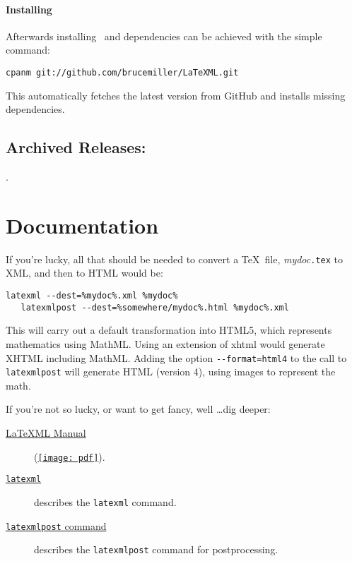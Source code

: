 \documentclass{article}
\newcommand{\PDFIcon}{\texttt{[image: pdf]}}
\begin{document}
\paragraph*{Installing} Afterwards installing \LaTeXML\ and dependencies can be achieved with the 
simple command:
\begin{lstlisting}[style=shell]
    cpanm git://github.com/brucemiller/LaTeXML.git
\end{lstlisting}
This automatically fetches the latest version from GitHub and installs 
missing dependencies. 

\subsection{Archived Releases:}\label{get.archive}
\AllReleases.

\section{Documentation}\label{docs}
If you're lucky, all that should be needed to convert
a \TeX\ file, \textit{mydoc}\texttt{.tex} to XML, and
then to HTML would be:
\begin{lstlisting}[style=shell]
   latexml --dest=%mydoc%.xml %mydoc%
   latexmlpost --dest=%somewhere/mydoc%.html %mydoc%.xml
\end{lstlisting}
This will carry out a default transformation into HTML5,
which represents mathematics using MathML.  Using an
extension of xhtml would generate XHTML including MathML.
Adding the option \verb|--format=html4| to the call to \verb|latexmlpost|
will generate HTML (version 4), using images to represent the math.

If you're not so lucky, or want to get fancy, well \ldots dig deeper:
\begin{description}
\item[\href{manual/}{LaTeXML Manual}] (\href{manual.pdf}{\PDFIcon}).
\item[\href{manual/commands/latexml.html}{\texttt{latexml}}]
    describes the \texttt{latexml} command.
\item[\href{manual/commands/latexmlpost.html}{\texttt{latexmlpost} command}]
   describes the \texttt{latexmlpost} command for postprocessing.
\end{description}

\end{document}
